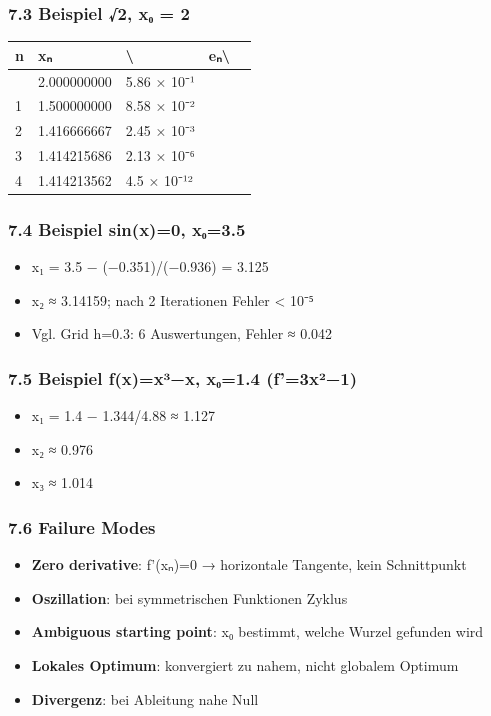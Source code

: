 \documentclass[11pt, a4paper]{article}
\begin{document}
\subsubsection{7.3 Beispiel √2, x₀ = 2}


{\small
\begin{tabularx}{\linewidth}{XXXXX}
\hline
\rowcolor{tableheadbg}
{\color{white}\textbf{n}} & {\color{white}\textbf{xₙ}} & {\color{white}\textbf{\textbackslash{}}} & {\color{white}\textbf{eₙ\textbackslash{}}} & {\color{white}\textbf{}} \\[2pt]
\hline
\endhead
\hline
\endfoot
0 & 2.000000000 & 5.86 × 10⁻¹ &  &  \\
1 & 1.500000000 & 8.58 × 10⁻² &  &  \\
2 & 1.416666667 & 2.45 × 10⁻³ &  &  \\
3 & 1.414215686 & 2.13 × 10⁻⁶ &  &  \\
4 & 1.414213562 & 4.5 × 10⁻¹² &  &  \\
\end{tabularx}
}



\subsubsection{7.4 Beispiel sin(x)=0, x₀=3.5}
\begin{itemize}
  \item x₁ = 3.5 − (−0.351)/(−0.936) = 3.125
  \item x₂ ≈ 3.14159; nach 2 Iterationen Fehler < 10⁻⁵
  \item Vgl. Grid h=0.3: 6 Auswertungen, Fehler ≈ 0.042
\end{itemize}


\subsubsection{7.5 Beispiel f(x)=x³−x, x₀=1.4 (f'=3x²−1)}
\begin{itemize}
  \item x₁ = 1.4 − 1.344/4.88 ≈ 1.127
  \item x₂ ≈ 0.976
  \item x₃ ≈ 1.014
\end{itemize}


\subsubsection{7.6 Failure Modes}
\begin{itemize}
  \item \textbf{Zero derivative}: f'(xₙ)=0 → horizontale Tangente, kein Schnittpunkt
  \item \textbf{Oszillation}: bei symmetrischen Funktionen Zyklus
  \item \textbf{Ambiguous starting point}: x₀ bestimmt, welche Wurzel gefunden wird
  \item \textbf{Lokales Optimum}: konvergiert zu nahem, nicht globalem Optimum
  \item \textbf{Divergenz}: bei Ableitung nahe Null
\end{itemize}
\end{document}
